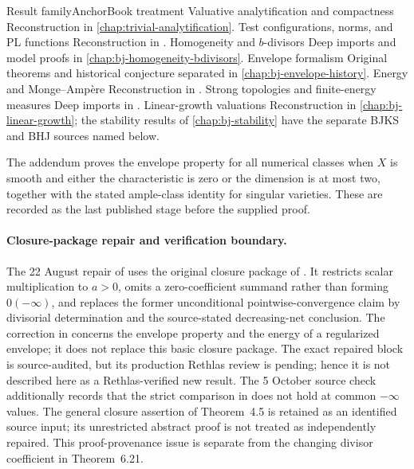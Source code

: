\begin{AppLProvenanceLedger}{Result family}{Anchor}{Book treatment}
\AppLProvenanceRecord
  {Valuative analytification and compactness}
  {\cite[\S\S1--2]{BJ22}}
  {Reconstruction in \cref{chap:trivial-analytification}.}
\AppLProvenanceRecord
  {Test configurations, norms, and PL functions}
  {\cite[\S\S2--4]{BJ22}}
  {Reconstruction in
   .}
\AppLProvenanceRecord
  {Homogeneity and \(b\)-divisors}
  {\cite[\S6]{BJ22}}
  {Deep imports and model proofs in \cref{chap:bj-homogeneity-bdivisors}.}
\AppLProvenanceRecord
  {Envelope formalism}
  {\cite[\S5]{BJ22}}
  {Original theorems and historical conjecture separated in
   \cref{chap:bj-envelope-history}.}
\AppLProvenanceRecord
  {Energy and Monge--Ampère}
  {\cite[\S\S7--10]{BJ22}}
  {Reconstruction in .}
\AppLProvenanceRecord
  {Strong topologies and finite-energy measures}
  {\cite[\S\S9--10 and \S\S12--13]{BJ22}}
  {Deep imports in
   .}
\AppLProvenanceRecord
  {Linear-growth valuations}
  {\cite[\S11]{BJ22}}
  {Reconstruction in \cref{chap:bj-linear-growth}; the stability results of
   \cref{chap:bj-stability} have
   the separate BJKS and BHJ sources named below.}
\end{AppLProvenanceLedger}

The addendum \cite{BJ22b} proves the envelope property for all numerical
classes when \(X\) is smooth and either the characteristic is zero or the
dimension is at most two, together with the stated ample-class identity for
singular varieties.  These are recorded as the last published stage before
the supplied proof.

\paragraph{Closure-package repair and verification boundary.}
The 22 August repair of  uses the original closure
package of \cite[Definition~4.1, Theorem~4.5, Lemmas~4.6 and~4.9,
Theorem~4.7, Corollary~4.17, Theorem~4.22, and Corollaries~4.23 and~4.25]{BJ22}.
It restricts scalar multiplication to \(a>0\), omits a zero-coefficient
summand rather than forming \(0(-\infty)\), and replaces the former
unconditional pointwise-convergence claim by divisorial determination and the
source-stated decreasing-net conclusion.  The correction in \cite{BJ22b}
concerns the envelope property and the energy of a regularized envelope; it
does not replace this basic closure package.  The exact repaired block is
source-audited, but its production Rethlas review is pending; hence it is not
described here as a Rethlas-verified new result.
The 5 October source check additionally records that the strict comparison
in \cite[Lemma~4.6, equation~(4.5)]{BJ22} does not hold at common
$-\infty$ values.  The general closure assertion of Theorem~4.5 is
retained as an identified source input; its unrestricted abstract proof
is not treated as independently repaired.  This proof-provenance issue
is separate from the changing divisor coefficient in Theorem~6.21.


